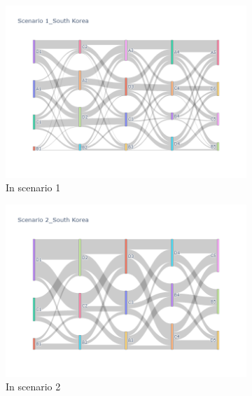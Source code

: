 \begin{figure}[h]
  \begin{subfigure}{0.5\textwidth}
    \centering
    \includegraphics[width=\textwidth]{Figure/figure33a.png}
    \caption{In scenario 1}
    \label{fig33a}
  \end{subfigure}
  \begin{subfigure}{0.5\textwidth}
    \centering
    \includegraphics[width=\linewidth]{Figure/figure33b.png}
    \caption{In scenario 2}
    \label{fig33b}
  \end{subfigure}
  \begin{subfigure}{0.5\textwidth}
    \centering

\end{subfigure}
\end{figure}
